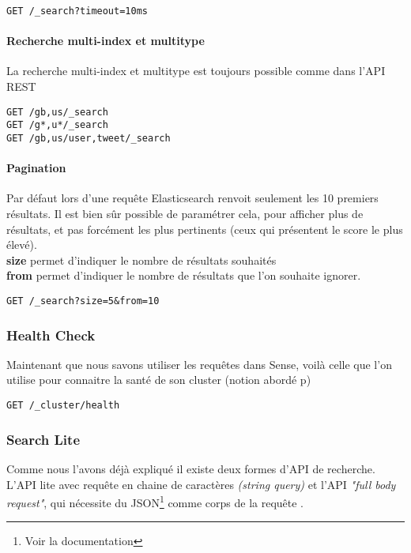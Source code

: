 {\begin{lstlisting}[style=code,label={lst:APIsearchemptyexample3},caption={Une recherche "vide" avec timeout}]
GET /_search?timeout=10ms
\end{lstlisting}


\paragraph{Recherche multi-index et multitype}
La recherche multi-index et multitype est toujours possible comme dans l'API REST

\begin{lstlisting}[style=code,label={lst:APIsearchemptyexample4},caption={Une recherche multi-index ...}]
GET /gb,us/_search
GET /g*,u*/_search
GET /gb,us/user,tweet/_search
\end{lstlisting}

\paragraph{Pagination}
Par défaut lors d'une requête Elasticsearch renvoit seulement les 10 premiers résultats.
Il est bien sûr possible de paramétrer cela, pour afficher plus de résultats, et pas
forcément les plus pertinents (ceux qui présentent le score le plus élevé).\\
\textbf{size} permet d'indiquer le nombre de résultats souhaités\\
\textbf{from} permet d'indiquer le nombre de résultats que l'on souhaite ignorer.

\begin{lstlisting}[style=code,label={lst:APIsearchemptyexample4},caption={Pagination}]
GET /_search?size=5&from=10
\end{lstlisting}

\subsubsection{Health Check}

Maintenant que nous savons utiliser les requêtes dans Sense, voilà celle que l'on
utilise pour connaitre la santé de son cluster (notion abordé p\pageref{subsec:labase})

\begin{lstlisting}[style=code,label={lst:elastichealth},caption={Santé du cluster}]
GET /_cluster/health
\end{lstlisting}


\subsubsection{Search Lite}
\label{subsec:elasticsearchlite}
Comme nous l'avons déjà expliqué il existe deux formes d'API de recherche. L'API lite avec requête
en chaine de caractères \textit{(string query)} et l'API \textit{"full body request"},
qui nécessite du JSON\footnote{Voir la documentation} comme corps de la requête .

}
